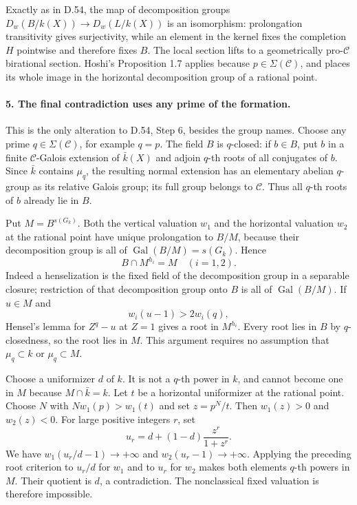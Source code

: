Exactly as in D.54, the map of decomposition groups
$D_w(B/k(X))\to D_w(L/k(X))$ is an isomorphism: prolongation
transitivity gives surjectivity, while an element in the kernel
fixes the completion $H$ pointwise and therefore fixes $B$.
The local section lifts to a geometrically pro-$\mathcal C$
birational section.  Hoshi's Proposition 1.7 applies because
$p\in\Sigma(\mathcal C)$, and places its whole image in the
horizontal decomposition group of a rational point.

\paragraph{5. The final contradiction uses any prime of the formation.}

This is the only alteration to D.54, Step 6, besides the group
names.  Choose any prime $q\in\Sigma(\mathcal C)$, for example
$q=p$.  The field $B$ is $q$-closed: if $b\in B$, put $b$ in a
finite $\mathcal C$-Galois extension of $\bar k(X)$ and adjoin
$q$-th roots of all conjugates of $b$.  Since $\bar k$ contains
$\mu_q$, the resulting normal extension has an elementary
abelian $q$-group as its relative Galois group; its full group
belongs to $\mathcal C$.  Thus all $q$-th roots of $b$ already
lie in $B$.

Put $M=B^{s(G_k)}$.  Both the vertical valuation $w_1$ and the
horizontal valuation $w_2$ at the rational point have unique
prolongation to $B/M$, because their decomposition group is all
of $\operatorname{Gal}(B/M)=s(G_k)$.  Hence
\[
                          B\cap M^{h_i}=M\quad(i=1,2).
\]
Indeed a henselization is the fixed field of the decomposition
group in a separable closure; restriction of that decomposition
group onto $B$ is all of $\operatorname{Gal}(B/M)$.
If $u\in M$ and
\[
                       w_i(u-1)>2w_i(q),
\]
Hensel's lemma for $Z^q-u$ at $Z=1$ gives a root in $M^{h_i}$.
Every root lies in $B$ by $q$-closedness, so the root lies in $M$.
This argument requires no assumption that $\mu_q\subset k$ or
$\mu_q\subset M$.

Choose a uniformizer $d$ of $k$.  It is not a $q$-th power in $k$,
and cannot become one in $M$ because $M\cap\bar k=k$.  Let $t$ be
a horizontal uniformizer at the rational point.  Choose $N$ with
$Nw_1(p)>w_1(t)$ and set $z=p^N/t$.  Then $w_1(z)>0$ and
$w_2(z)<0$.  For large positive integers $r$, set
\[
                  u_r=d+(1-d)\frac{z^r}{1+z^r}.
\]
We have $w_1(u_r/d-1)\to+\infty$ and
$w_2(u_r-1)\to+\infty$.  Applying the preceding root criterion
to $u_r/d$ for $w_1$ and to $u_r$ for $w_2$ makes both elements
$q$-th powers in $M$.  Their quotient is $d$, a contradiction.
The nonclassical fixed valuation is therefore impossible.

